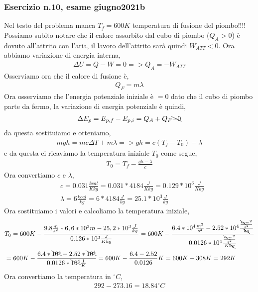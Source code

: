         \subsubsection{Esercizio n.10, esame giugno2021b}
            Nel testo del problema manca $T_f = 600K$ temperatura di fusione del piombo!!!!\\
            Possiamo subito notare che il calore assorbito dal cubo di piombo ($Q_A > 0$) è dovuto all'attrito con l'aria, il lavoro dell'attrito sarà quindi $W_{ATT} < 0$. Ora abbiamo variazione di energia interna,
            \begin{align*}
                \Delta U = Q - W = 0 => Q_A = -W_{ATT}
            \end{align*}
            Osserviamo ora che il calore di fusione è,
            \begin{align*}
                Q_F = m\lambda
            \end{align*}
            Ora osserviamo che l'energia potenziale iniziale è $=0$ dato che il cubo di piombo parte da fermo, la variazione di energia potenziale è quindi,
            \begin{align*}
                \Delta E_p = E_{p,f} - E_{p,i} = Q_A + Q_F \bcancel{- 0}
            \end{align*}
            da questa sostituiamo e otteniamo,
            \begin{align*}
                mgh = mc\Delta T + m\lambda => gh = c(T_f - T_0) + \lambda
            \end{align*}
            e da questa ci ricaviamo la temperatura iniziale $T_0$ come segue,
            \begin{align*}
                T_0 = T_f - \frac{gh - \lambda}{c}
            \end{align*}
            Ora convertiamo $c$ e $\lambda$,
            \begin{align*}
                &c=0.031\frac{kcal}{Kkg}= 0.031*4184\frac{J}{Kkg}= 0.129*10^3\frac{J}{Kkg}\\
                &\lambda=6\frac{kcal}{kg}=6*4184\frac{J}{kg}=25.1*10^3\frac{J}{kg}
            \end{align*}
            Ora sostituiamo i valori e calcoliamo la temperatura iniziale,
            \begin{align*}
                &T_0 = 600K - \frac{9.8\frac{m}{s^2}*6,6*10^3m - 25,2*10^3 \frac{J}{kg}}{0.126* 10^3\frac{J}{Kkg}}= 600K - \frac{6.4*10^4\frac{m^2}{s^2} - 2.52* 10^4 \frac{\frac{\bcancel{kg}m^2}{s^2}}{\bcancel{kg}}}{0.0126*10^4\frac{\frac{\bcancel{kg}m^2}{s^2}}{K\bcancel{kg}}}\\
                &= 600K - \frac{6.4*\bcancel{10^4} - 2.52* \bcancel{10^4}}{0.0126*\bcancel{10^4}\frac{1}{K}} = 600K - \frac{6.4 - 2.52}{0.0126}K = 600K - 308K = 292K
            \end{align*}
            Ora convertiamo la temperatura in $^{\circ}C$,
            \begin{align*}
                292 - 273.16 = 18.84^{\circ}C
            \end{align*}

